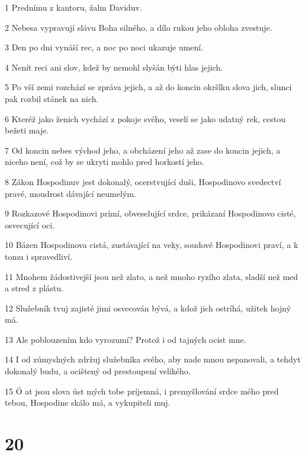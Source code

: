 \par 1 Prednímu z kantoru, žalm Daviduv.
\par 2 Nebesa vypravují slávu Boha silného, a dílo rukou jeho obloha zvestuje.
\par 3 Den po dni vynáší rec, a noc po noci ukazuje umení.
\par 4 Nenít reci ani slov, kdež by nemohl slyšán býti hlas jejich.
\par 5 Po vší zemi rozchází se zpráva jejich, a až do koncin okršlku slova jich, slunci pak rozbil stánek na nich.
\par 6 Kteréž jako ženich vychází z pokoje svého, veselí se jako udatný rek, cestou bežeti maje.
\par 7 Od koncin nebes východ jeho, a obcházení jeho až zase do koncin jejich, a niceho není, což by se ukryti mohlo pred horkostí jeho.
\par 8 Zákon Hospodinuv jest dokonalý, ocerstvující duši, Hospodinovo svedectví pravé, moudrost dávající neumelým.
\par 9 Rozkazové Hospodinovi prímí, obveselující srdce, prikázaní Hospodinovo cisté, osvecující oci.
\par 10 Bázen Hospodinova cistá, zustávající na veky, soudové Hospodinovi praví, a k tomu i spravedliví.
\par 11 Mnohem žádostivejší jsou než zlato, a než mnoho ryzího zlata, sladší než med a stred z plástu.
\par 12 Služebník tvuj zajisté jimi osvecován bývá, a kdož jich ostríhá, užitek hojný má.
\par 13 Ale poblouzením kdo vyrozumí? Protož i od tajných ocist mne.
\par 14 I od zúmyslných zdržuj služebníka svého, aby nade mnou nepanovali, a tehdyt dokonalý budu, a ocištený od prestoupení velikého.
\par 15 Ó at jsou slova úst mých tobe príjemná, i premyšlování srdce mého pred tebou, Hospodine skálo má, a vykupiteli muj.

\chapter{20}

